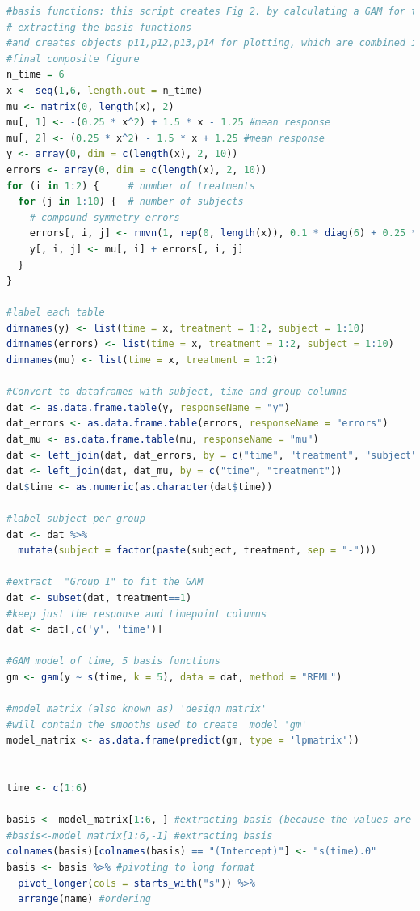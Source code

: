 \documentclass[
]{article}
\begin{document}
\begin{lstlisting}[language=R]
#basis functions: this script creates Fig 2. by calculating a GAM for the Group 1 data of Figure 1,
# extracting the basis functions
#and creates objects p11,p12,p13,p14 for plotting, which are combined in b_plot to create the
#final composite figure
n_time = 6
x <- seq(1,6, length.out = n_time)
mu <- matrix(0, length(x), 2)
mu[, 1] <- -(0.25 * x^2) + 1.5 * x - 1.25 #mean response
mu[, 2] <- (0.25 * x^2) - 1.5 * x + 1.25 #mean response
y <- array(0, dim = c(length(x), 2, 10))
errors <- array(0, dim = c(length(x), 2, 10))
for (i in 1:2) {     # number of treatments
  for (j in 1:10) {  # number of subjects
    # compound symmetry errors
    errors[, i, j] <- rmvn(1, rep(0, length(x)), 0.1 * diag(6) + 0.25 * matrix(1, 6, 6))
    y[, i, j] <- mu[, i] + errors[, i, j]
  }
}

#label each table
dimnames(y) <- list(time = x, treatment = 1:2, subject = 1:10)
dimnames(errors) <- list(time = x, treatment = 1:2, subject = 1:10)
dimnames(mu) <- list(time = x, treatment = 1:2)

#Convert to dataframes with subject, time and group columns
dat <- as.data.frame.table(y, responseName = "y")
dat_errors <- as.data.frame.table(errors, responseName = "errors")
dat_mu <- as.data.frame.table(mu, responseName = "mu")
dat <- left_join(dat, dat_errors, by = c("time", "treatment", "subject"))
dat <- left_join(dat, dat_mu, by = c("time", "treatment"))
dat$time <- as.numeric(as.character(dat$time))

#label subject per group
dat <- dat %>%
  mutate(subject = factor(paste(subject, treatment, sep = "-")))

#extract  "Group 1" to fit the GAM
dat <- subset(dat, treatment==1)
#keep just the response and timepoint columns
dat <- dat[,c('y', 'time')]

#GAM model of time, 5 basis functions
gm <- gam(y ~ s(time, k = 5), data = dat, method = "REML")

#model_matrix (also known as) 'design matrix'
#will contain the smooths used to create  model 'gm'
model_matrix <- as.data.frame(predict(gm, type = 'lpmatrix'))


time <- c(1:6)

basis <- model_matrix[1:6, ] #extracting basis (because the values are repeated after every 6 rows)
#basis<-model_matrix[1:6,-1] #extracting basis
colnames(basis)[colnames(basis) == "(Intercept)"] <- "s(time).0"
basis <- basis %>% #pivoting to long format
  pivot_longer(cols = starts_with("s")) %>%
  arrange(name) #ordering


\end{lstlisting}
\end{document}
